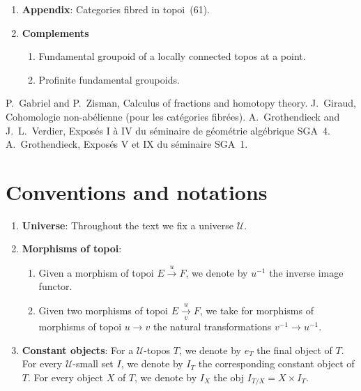 \documentclass[10pt]{amsart}
\newcommand{\cal}{\mathcal}
\begin{document}
\begin{enumerate}[label=\arabic*.]
    I removed it in the corollary of Proposition~4.6.2, which directly describes the locally constant objects of the inductive limit.
    The advantage of the form (4.5) is to allow explicit calculations, which are developed in the points 4.6.3 and 4.6.7.
  \item[A.] \textbf{Appendix}: Categories fibred in topoi~(61).
  \item \textbf{Complements}
    \begin{enumerate}[label=5.\arabic*.]
      \item Fundamental groupoid of a locally connected topos at a point.
      \item Profinite fundamental groupoids.
    \end{enumerate}
\end{enumerate}

\begin{thebibliography}{4}
   P.~Gabriel and P.~Zisman, {Calculus of fractions and homotopy theory}.
   J.~Giraud, {Cohomologie non-ab\'elienne (pour les cat\'egories fibr\'ees)}.
   A.~Grothendieck and J.~L.~Verdier, {Expos\'es I \`a IV du s\'eminaire de g\'eom\'etrie alg\'ebrique SGA~4}.
   A.~Grothendieck, {Expos\'es V et IX du s\'eminaire SGA~1}.
\end{thebibliography}

\section*{Conventions and notations}

\begin{enumerate}[label=(\arabic*)]
  \item \textbf{Universe}: Throughout the text we fix a universe $\cal{U}$.
  \item \textbf{Morphisms of topoi}:
    \begin{enumerate}[label=(\alph*)]
      \item Given a morphism of topoi $E\xrightarrow{u}F$, we denote by $u^{-1}$ the inverse image functor.
      \item Given two morphisms of topoi $E\xrightarrow[v]{u}F$, we take for morphisms of morphisms of topoi $u\to v$ the natural transformations $v^{-1}\to u^{-1}$.
    \end{enumerate}
  \item \textbf{Constant objects}: For a $\cal{U}$-topos $T$, we denote by $e_T$ the final object of $T$.
    For every $\cal{U}$-small set $I$, we denote by $I_T$ the corresponding constant object of $T$.
    For every object $X$ of $T$, we denote by $I_X$ the obj $I_{T/X}=X\times I_T$.
\end{enumerate}
\end{document}
